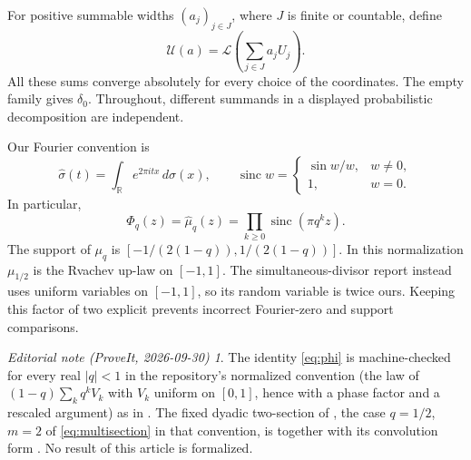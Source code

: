 \documentclass[11pt,letterpaper]{article}
\theoremstyle{definition}
\theoremstyle{remark}
\newtheorem*{ednote}{Editorial note (ProveIt, 2026-09-30)}
\newcommand{\R}{\mathbb R}
\newcommand{\Law}{\mathcal L}
\newcommand{\Un}{\mathcal U}
\newcommand{\sinc}{\operatorname{sinc}}
\numberwithin{equation}{section}
\begin{document}
For positive summable widths $(a_j)_{j\in J}$, where $J$ is finite or countable, define
\[
 \Un(a)=\Law\left(\sum_{j\in J}a_jU_j\right).
\]
All these sums converge absolutely for every choice of the coordinates. The empty family gives $\delta_0$. Throughout, different summands in a displayed probabilistic decomposition are independent.

Our Fourier convention is
\[
 \widehat\sigma(t)=\int_{\R}e^{2\pi itx}\,d\sigma(x),
 \qquad \sinc w=\begin{cases}\sin w/w,&w\ne0,\\1,&w=0.\end{cases}
\]
In particular,
\begin{equation}\label{eq:phi}
 \Phi_q(z)=\widehat\mu_q(z)
 =\prod_{k\ge0}\sinc(\pi q^kz).
\end{equation}
The support of $\mu_q$ is $[-1/(2(1-q)),1/(2(1-q))]$. In this normalization $\mu_{1/2}$ is the Rvachev up-law on $[-1,1]$. The simultaneous-divisor report \cite{repo-hall} instead uses uniform variables on $[-1,1]$, so its random variable is twice ours. Keeping this factor of two explicit prevents incorrect Fourier-zero and support comparisons.
\begin{ednote}
The identity \eqref{eq:phi} is machine-checked for every real $|q|<1$ in the
repository's normalized convention (the law of $(1-q)\sum_kq^kV_k$ with $V_k$
uniform on $[0,1]$, hence with a phase factor and a rescaled argument) as
in
.
The fixed dyadic two-section of \cite{repo-multisection}, the case $q=1/2$,
$m=2$ of \eqref{eq:multisection} in that convention, is
together with its convolution form
.
No result of this article is formalized.
\end{ednote}
\end{document}
